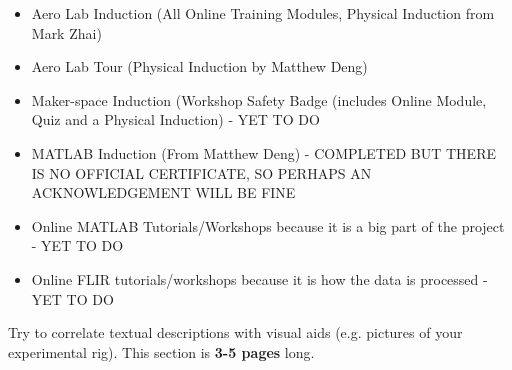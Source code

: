 \begin{itemize}
    \begin{itemize}
        \item Aero Lab Induction (All Online Training Modules, Physical Induction from Mark Zhai)
        \item Aero Lab Tour (Physical Induction by Matthew Deng)
        \item Maker-space Induction (Workshop Safety Badge (includes Online Module, Quiz and a Physical Induction) - YET TO DO
        \item MATLAB Induction (From Matthew Deng) - COMPLETED BUT THERE IS NO OFFICIAL CERTIFICATE, SO PERHAPS AN ACKNOWLEDGEMENT WILL BE FINE
        \item Online MATLAB Tutorials/Workshops because it is a big part of the project - YET TO DO
        \item Online FLIR tutorials/workshops because it is how the data is processed - YET TO DO
    \end{itemize}
\end{itemize}
Try to correlate textual descriptions with visual aids (e.g. pictures of your experimental rig).
This section is \textbf{3-5 pages} long. 

\pagebreak